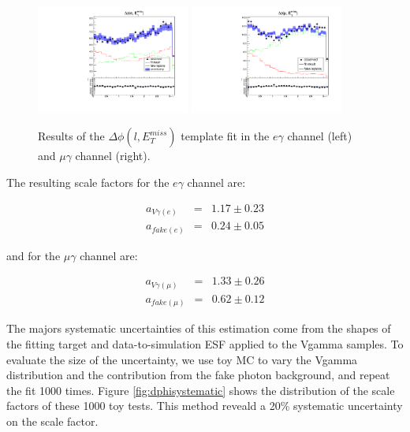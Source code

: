 \documentclass[thesis.tex]{subfiles}
\renewcommand\_{\textunderscore\allowbreak}
\begin{document}
\begin{figure}
  \centering
    \includegraphics[width=0.45\textwidth]{Figures/fit_dPhi_eg_0_1000_met40_iso4.pdf}
    \includegraphics[width=0.45\textwidth]{Figures/fit_dPhi_mg_0_1000_met40_iso4.pdf}
  \caption{Results of the $\Delta\phi(l,E_{T}^{miss})$ template fit in the $e\gamma$ channel (left) and $\mu\gamma$ channel (right).}
    \label{fig:dphifitresult}
\end{figure}

The resulting scale factors for the $e\gamma$ channel are:

\begin{eqnarray*}
	a_{V\gamma(e)} &=& 1.17 \pm 0.23 \\
	a_{fake(e)}  &=& 0.24 \pm 0.05
\end{eqnarray*}

and for the $\mu\gamma$ channel are:

\begin{eqnarray*}
	a_{V\gamma(\mu)} &=& 1.33 \pm 0.26 \\
	a_{fake(\mu)}  &=& 0.62 \pm 0.12
\end{eqnarray*}


The majors systematic uncertainties of this estimation come from the shapes of the fitting target and data-to-simulation ESF applied to the Vgamma samples. To evaluate the size of the uncertainty, we use toy MC to vary the Vgamma distribution and the contribution from the fake photon background, and 
repeat the fit 1000 times. Figure \ref{fig:dphisystematic} shows the distribution of the scale factors of these 1000 toy tests. This method reveald a 20\% systematic uncertainty on the scale factor.
\end{document}
